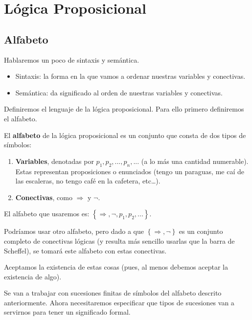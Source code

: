 \documentclass[12pt]{report}
\newcounter{it}
\theoremstyle{largebreak}
\begin{document}
    \chapter{Lógica Proposicional}

    \section{Alfabeto}

    Hablaremos un poco de sintaxis y semántica.

    \begin{itemize}
        \item Sintaxis: la forma en la que vamos a ordenar nuestras variables y conectivas.
        \item Semántica: da significado al orden de nuestras variables y conectivas.
    \end{itemize}

    Definiremos el lenguaje de la lógica proposicional. Para ello primero definiremos el alfabeto.

    El \textbf{alfabeto} de la lógica proposicional es un conjunto que consta de dos tipos de símbolos:
    \begin{enumerate}
        \item \textbf{Variables}, denotadas por $p_1,p_2,...,p_n,...$ (a lo más una cantidad numerable). Estas representan proposiciones o enunciados (tengo un paraguas, me caí de las escaleras, no tengo café en la cafetera, etc\dots).
        \item \textbf{Conectivas}, como $\Rightarrow$ y $\neg$.
    \end{enumerate}

    El alfabeto que usaremos es: $\left\{\Rightarrow,\neg,p_1,p_2,... \right\}$.

    \begin{obs}
        Podríamos usar otro alfabeto, pero dado a que $\left\{\Rightarrow,\neg \right\}$ es un conjunto completo de conectivas lógicas (y resulta más sencillo usarlas que la barra de Scheffel), se tomará este alfabeto con estas conectivas.
    \end{obs}

    Aceptamos la existencia de estas cosas (pues, al menos debemos aceptar la existencia de algo).

    Se van a trabajar con sucesiones finitas de símbolos del alfabeto descrito anteriormente. Ahora necesitaremos especificar que tipos de sucesiones van a servirnos para tener un significado formal.
\end{document}
